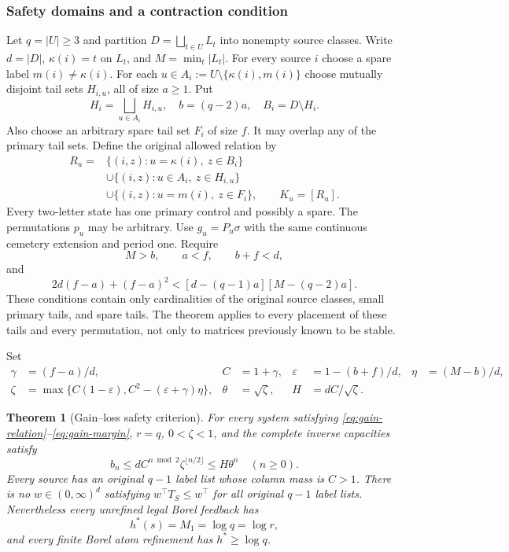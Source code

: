 \documentclass[11pt,reqno]{amsart}
\numberwithin{equation}{section}
\newtheorem{theorem}{Theorem}[section]
\theoremstyle{definition}
\theoremstyle{definition}
\newcommand{\eps}{\varepsilon}
\begin{document}
\subsubsection{Safety domains and a contraction condition}
Let $q=|U|\ge3$ and partition $D=\bigsqcup_{t\in U}L_t$ into
nonempty source classes. Write $d=|D|$,
$\kappa(i)=t$ on $L_t$, and $M=\min_t|L_t|$.
For every source $i$ choose a spare label $m(i)\ne\kappa(i)$.
For each $u\in A_i:=U\setminus\{\kappa(i),m(i)\}$ choose
mutually disjoint tail sets $H_{i,u}$, all of size $a\ge1$.
Put
\[
 H_i=\bigsqcup_{u\in A_i}H_{i,u},\quad b=(q-2)a,\quad
 B_i=D\setminus H_i.
\]
Also choose an arbitrary spare tail set $F_i$ of size $f$.
It may overlap any of the primary tail sets. Define the original
allowed relation by
\begin{align}
 R_u={}&\{(i,z):u=\kappa(i),\ z\in B_i\}\nonumber\\
 &\cup\{(i,z):u\in A_i,\ z\in H_{i,u}\}\label{eq:gain-relation}\\
 &\cup\{(i,z):u=m(i),\ z\in F_i\},\qquad K_u=[R_u].\nonumber
\end{align}
Every two-letter state has one primary control and possibly a spare.
The permutations $p_u$ may be arbitrary. Use $g_u=P_u\sigma$
with the same continuous cemetery extension and period one.
Require
\begin{equation}\label{eq:gain-counts}
 M>b,\qquad a<f,\qquad b+f<d,
\end{equation}
and
\begin{equation}\label{eq:gain-margin}
 2d(f-a)+(f-a)^2<[d-(q-1)a][M-(q-2)a].
\end{equation}
These conditions contain only cardinalities of the original source
classes, small primary tails, and spare tails. The theorem applies
to every placement of these tails and every permutation, not only
to matrices previously known to be stable.

Set
\begin{align}
 \gamma&=(f-a)/d,& C&=1+\gamma,&
 \eps&=1-(b+f)/d,& \eta&=(M-b)/d,\nonumber\\
 \zeta&=\max\{C(1-\eps),C^2-(\eps+\gamma)\eta\},&
 \theta&=\sqrt\zeta,&H&=dC/\sqrt\zeta.
 \label{eq:gain-constants}
\end{align}

\begin{theorem}[Gain--loss safety criterion]\label{thm:gainloss}
For every system satisfying \eqref{eq:gain-relation}--\eqref{eq:gain-margin},
$r=q$, $0<\zeta<1$, and the complete inverse capacities satisfy
\begin{equation}\label{eq:gain-bn}
 b_n\le dC^{n\bmod2}\zeta^{\lfloor n/2\rfloor}
 \le H\theta^n\quad(n\ge0).
\end{equation}
Every source has an original $q-1$ label list whose column mass is
$C>1$. There is no $w\in(0,\infty)^d$ satisfying
$w^\top T_S\le w^\top$ for all original $q-1$ label lists.
Nevertheless every unrefined legal Borel feedback has
\begin{equation}\label{eq:gain-M}
 h^*(s)=M_1=\log q=\log r,
\end{equation}
and every finite Borel atom refinement has $h^*\ge\log q$.
\end{theorem}
\end{document}
